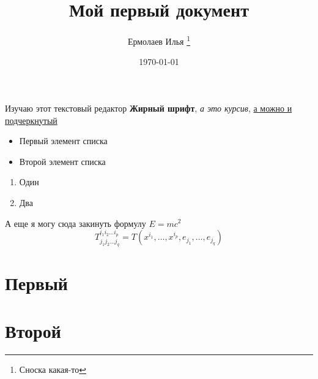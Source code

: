 \documentclass[a4paper,12pt]{book}
\author{Ермолаев Илья \thanks{Сноска какая-то}}
\title{Мой первый документ}
\date{\today}
\begin{document}
	\maketitle
	\pagebreak
	Изучаю этот текстовый редактор %
	\textbf{Жирный шрифт}, \textit{а это курсив}, \underline{а можно и подчеркнутый}
	\begin{itemize}
		\item Первый элемент списка
		\item Второй элемент списка
	\end{itemize}
	\begin{enumerate}
		\item Один
		\item Два
	\end{enumerate}
	А еще я могу сюда закинуть формулу $E=mc^2$
	\[ T^{i_1 i_2 \dots i_p}_{j_1 j_2 \dots j_q} = T(x^{i_1},\dots,x^{i_p},e_{j_1},\dots,e_{j_q}) \]
	
	\part{Первый}
	\part{Второй}
\end{document}
